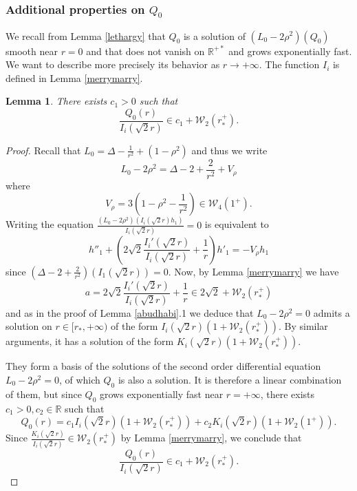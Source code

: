 \documentclass[11 pt]{amsart}
\newtheorem{lem}{Lemma}[section]
\theoremstyle{definition}
\theoremstyle{remark}
\numberwithin{equation}{section}
\begin{document}
\subsubsection{Additional properties on $Q_0$}

We recall from Lemma \ref{lethargy} that $Q_0$ is a solution of $(L_0 - 2
\rho^2) (Q_0)$ smooth near $r = 0$ and that does not vanish on $\mathbb{R}^{+
\ast}$ and grows exponentially fast. We want to describe more precisely its behavior as $r \to + \infty$. The function $I_i$ is defined in Lemma \ref{merrymarry}.

\begin{lem}
  \label{heimat}There exists $c_1 > 0$ such that
  \[ \frac{Q_0 (r)}{I_i \left( \sqrt{2} r \right)} \in c_1 +\mathcal{W}_2
     (r_\ast^+) . \]
\end{lem}

\begin{proof}
  Recall that $L_0 = \Delta - \frac{1}{r^2} + (1 - \rho^2)$ and thus we write
  \[ L_0 - 2 \rho^2 = \Delta - 2 + \frac{2}{r^2} + V_{\rho} \]
  where
  \[ V_{\rho} = 3 \left( 1 - \rho^2 - \frac{1}{r^2} \right) \in
     \mathcal{W}_4 (1^+) . \]
  Writing the equation $\frac{(L_0 - 2 \rho^2) \left( I_i \left( \sqrt{2} r
  \right) h_1 \right)}{I_i \left( \sqrt{2} r \right)} = 0$ is equivalent to
  \[ h''_1 + \left( 2 \sqrt{2} \frac{I_i' \left( \sqrt{2} r \right)}{I_i
     \left( \sqrt{2} r \right)} + \frac{1}{r} \right) h'_1 = - V_{\rho} h_1 \]
  since $\left( \Delta - 2 + \frac{2}{r^2} \right) \left( I_1 \left( \sqrt{2}
  r \right) \right) = 0$. Now, by Lemma \ref{merrymarry} we have
  \[ a = 2 \sqrt{2} \frac{I_i' \left( \sqrt{2} r \right)}{I_i \left( \sqrt{2}
     r \right)} + \frac{1}{r} \in 2 \sqrt{2} +\mathcal{W}_2 (r_\ast^+) \]
  and as in the proof of Lemma \ref{abudhabi}.1 we deduce that $L_0 - 2 \rho^2
  = 0$ admits a solution on $r \in [r_\ast, + \infty )$ of the form $I_i \left(
  \sqrt{2} r \right) (1 +\mathcal{W}_2 (r_\ast^+))$. By similar arguments, it has a
  solution of the form $K_i \left( \sqrt{2} r \right) (1 +\mathcal{W}_2
  (r_\ast^+))$.
  
  They form a basis of the solutions of the second order differential equation
  $L_0 - 2 \rho^2 = 0$, of which $Q_0$ is also a solution. It is therefore a
  linear combination of them, but since $Q_0$ grows exponentially fast near $r
  = + \infty$, there exists $c_1 > 0, c_2 \in \mathbb{R}$ such that
  \[ Q_0 (r) = c_1 I_i \left( \sqrt{2} r \right) (1 +\mathcal{W}_2 (r_\ast^+)) +
     c_2 K_i \left( \sqrt{2} r \right) (1 +\mathcal{W}_2 (1^+)) . \]
  Since $\frac{K_i \left( \sqrt{2} r \right)}{I_i \left( \sqrt{2} r \right)}
  \in \mathcal{W}_2 (r_\ast^+)$ by Lemma \ref{merrymarry}, we conclude that
  \[ \frac{Q_0 (r)}{I_i \left( \sqrt{2} r \right)} \in c_1 +\mathcal{W}_2
     (r_\ast^+) . \]
\end{proof}
\end{document}
